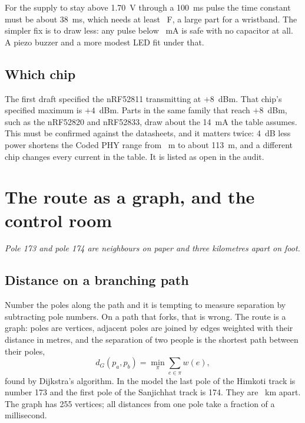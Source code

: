 \documentclass[11pt,a4paper,twoside,openany]{book}
\newcommand{\hook}[1]{{\noindent\fontsize{13}{19}\selectfont\itshape\color{rsmuted}#1\par}\vspace{12pt}}
\begin{document}
For the supply to stay above 1.70~V through a 100~ms pulse the time constant must be about 38~ms, which needs at least
\CapNeed~\textmu F, a large part for a wristband. The simpler fix is to draw less: any pulse below \PulseMax~mA is
safe with no capacitor at all. A piezo buzzer and a more modest LED fit under that.

\section{Which chip}
The first draft specified the nRF52811 transmitting at $+8$~dBm. That chip's specified maximum is $+4$~dBm. Parts in
the same family that reach $+8$~dBm, such as the nRF52820 and nRF52833, draw about the 14~mA the table assumes. This
must be confirmed against the datasheets, and it matters twice: 4~dB less power shortens the Coded PHY range from
\RangeCoded~m to about 113~m, and a different chip changes every current in the table. It is listed as open in the
audit.

\chapter{The route as a graph, and the control room}\label{ch:server}
\hook{Pole 173 and pole 174 are neighbours on paper and three kilometres apart on foot.}
\section{Distance on a branching path}
Number the poles along the path and it is tempting to measure separation by subtracting pole numbers. On a path that
forks, that is wrong. The route is a graph: poles are vertices, adjacent poles are joined by edges weighted with their
distance in metres, and the separation of two people is the shortest path between their poles,
\begin{equation}d_G(p_a,p_b)=\min_{\pi}\sum_{e\in\pi}w(e),\end{equation}
found by Dijkstra's algorithm. In the model the last pole of the Himkoti track is number 173 and the first pole of the
Sanjichhat track is 174. They are \BranchExample~km apart. The graph has 255 vertices; all distances from one pole take
a fraction of a millisecond.
\end{document}
